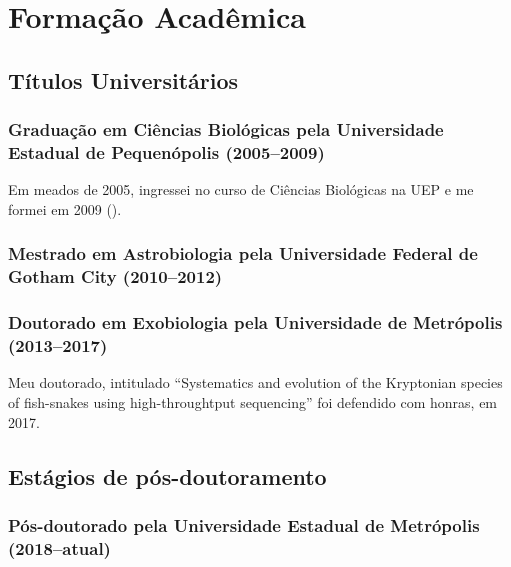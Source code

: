 \section{Formação Acadêmica}
\label{sec:formacao}

\lipsum[3-4]

\subsection{Títulos Universitários}
\label{subsec:titulos}  
    \subsubsection{Graduação em Ciências Biológicas pela Universidade Estadual de Pequenópolis (2005--2009)}
   
Em meados de 2005, ingressei no curso de Ciências Biológicas na UEP e me formei em 2009 (). \lipsum[5-6]
    
    \subsubsection{Mestrado em Astrobiologia pela Universidade Federal de Gotham City (2010--2012)}
    
\lipsum[7-8]
    
    \subsubsection{Doutorado em Exobiologia pela Universidade de Metrópolis (2013--2017)}

Meu doutorado, intitulado \foreignquote{english}{Systematics and evolution of the Kryptonian species of fish-snakes using high-throughtput sequencing} foi defendido com honras, em 2017.

\lipsum[9-10]
    
\subsection{Estágios de pós-doutoramento}
\label{subsec:posdoc}
    
    \subsubsection{Pós-doutorado pela Universidade Estadual de Metrópolis (2018--atual)}

\lipsum[11-14]
